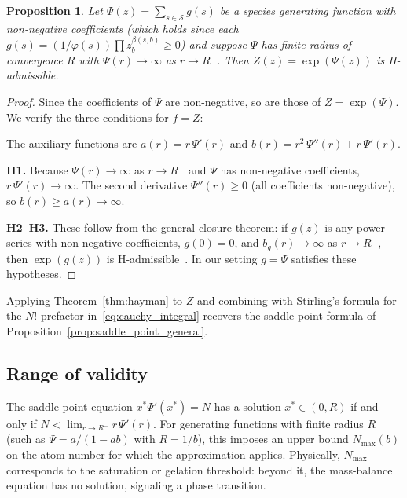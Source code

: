 \documentclass[11pt]{amsart}
\newcommand{\Species}{\mathcal{S}}
\newcommand{\GFensemble}{Z}
\newcommand{\GFcomb}{\Psi}
\theoremstyle{definition}
\theoremstyle{plain}
\newtheorem{proposition}{Proposition}
\theoremstyle{remark}
\begin{document}
\begin{proposition}
\label{prop:ensemble_admissible}
Let $\GFcomb(z)=\sum_{s\in\Species}g(s)$ be a species generating function with non-negative coefficients (which holds since each $g(s) = (1/\varphi(s))\prod z_b^{\beta(s,b)}\ge 0$) and suppose $\GFcomb$ has finite radius of convergence $R$ with $\GFcomb(r)\to\infty$ as $r\to R^-$.
Then $\GFensemble(z)=\exp(\GFcomb(z))$ is H-admissible.
\end{proposition}

\begin{proof}
Since the coefficients of $\GFcomb$ are non-negative, so are those of $\GFensemble = \exp(\GFcomb)$.
We verify the three conditions for $f = \GFensemble$:

The auxiliary functions are $a(r) = r\,\GFcomb'(r)$ and $b(r) = r^2\,\GFcomb''(r) + r\,\GFcomb'(r)$.

\textbf{H1.} Because $\GFcomb(r)\to\infty$ as $r\to R^-$ and $\GFcomb$ has non-negative coefficients, $r\,\GFcomb'(r)\to\infty$.
The second derivative $\GFcomb''(r)\ge 0$ (all coefficients non-negative), so $b(r)\ge a(r)\to\infty$.

\textbf{H2--H3.} These follow from the general closure theorem: if $g(z)$ is any power series with non-negative coefficients, $g(0)=0$, and $b_g(r)\to\infty$ as $r\to R^-$, then $\exp(g(z))$ is H-admissible~\cite[Theorem~VIII.5]{flajolet2009analytic}.
In our setting $g=\GFcomb$ satisfies these hypotheses.
\end{proof}

Applying Theorem~\ref{thm:hayman} to $\GFensemble$ and combining with Stirling's formula for the $N!$ prefactor in~\eqref{eq:cauchy_integral} recovers the saddle-point formula of Proposition~\ref{prop:saddle_point_general}.

\subsection{Range of validity}

The saddle-point equation $x^*\GFcomb'(x^*)=N$ has a solution $x^*\in(0,R)$ if and only if $N<\lim_{r\to R^-}r\,\GFcomb'(r)$.
For generating functions with finite radius $R$ (such as $\GFcomb = a/(1-ab)$ with $R=1/b$), this imposes an upper bound $N_{\max}(b)$ on the atom number for which the approximation applies.
Physically, $N_{\max}$ corresponds to the saturation or gelation threshold: beyond it, the mass-balance equation has no solution, signaling a phase transition.
\end{document}
